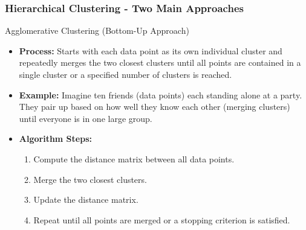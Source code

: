 \documentclass{beamer}
\begin{document}
\begin{frame}[fragile]
    \frametitle{Hierarchical Clustering - Two Main Approaches}
    \begin{block}{Agglomerative Clustering (Bottom-Up Approach)}
        \begin{itemize}
            \item \textbf{Process:} Starts with each data point as its own individual cluster and repeatedly merges the two closest clusters until all points are contained in a single cluster or a specified number of clusters is reached.
            \item \textbf{Example:} Imagine ten friends (data points) each standing alone at a party. They pair up based on how well they know each other (merging clusters) until everyone is in one large group.
            \item \textbf{Algorithm Steps:}
                \begin{enumerate}
                    \item Compute the distance matrix between all data points.
                    \item Merge the two closest clusters.
                    \item Update the distance matrix.
                    \item Repeat until all points are merged or a stopping criterion is satisfied.
                \end{enumerate}
        \end{itemize}
    \end{block}
\end{frame}
\end{document}
